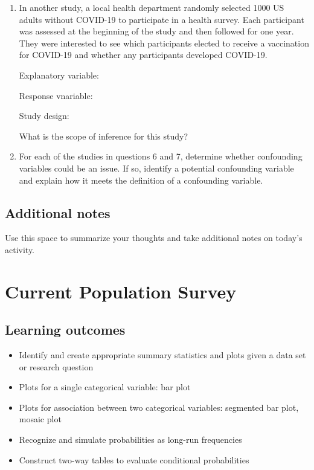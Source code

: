 \documentclass[
]{report}
\begin{document}
\newpage

\begin{enumerate}
\def\labelenumi{\arabic{enumi}.}
\setcounter{enumi}{6}
\item
  In another study, a local health department randomly selected 1000 US adults without COVID-19 to participate in a health survey. Each participant was assessed at the beginning of the study and then followed for one year. They were interested to see which participants elected to receive a vaccination for COVID-19 and whether any participants developed COVID-19.
  \vspace{0.1in}

  Explanatory variable:
  \vspace{0.25in}

  Response vnariable:
  \vspace{0.25in}

  Study design:
  \vspace{0.25in}

  What is the scope of inference for this study?
  \vspace{0.5in}
\item
  For each of the studies in questions 6 and 7, determine whether confounding variables could be an issue. If so, identify a potential confounding variable and explain how it meets the definition of a confounding variable.
  \vspace{1.5in}
\end{enumerate}

\hypertarget{additional-notes}{%
\section{Additional notes}\label{additional-notes}}

Use this space to summarize your thoughts and take additional notes on today's activity.

\hypertarget{current-population-survey}{%
\chapter{Current Population Survey}\label{current-population-survey}}

\hypertarget{learning-outcomes}{%
\section{Learning outcomes}\label{learning-outcomes}}

\begin{itemize}
\item
  Identify and create appropriate summary statistics and plots
  given a data set or research question
\item
  Plots for a single categorical variable: bar plot
\item
  Plots for association between two categorical variables:
  segmented bar plot, mosaic plot
\item
  Recognize and simulate probabilities as long-run frequencies
\item
  Construct two-way tables to evaluate conditional probabilities
\end{itemize}
\end{document}
